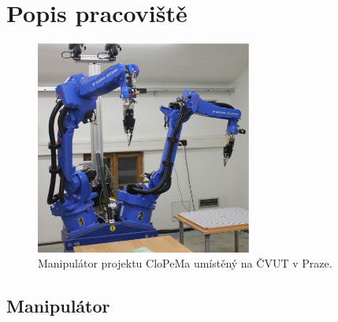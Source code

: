 \documentclass[10pt,a4paper,titlepage,oneside]{report}
\begin{document}
\section{Popis pracoviště}
\label{sec:desription}


\begin{figure}[H]
	\centering  	
  	\includegraphics[height=7cm]{pictures/robotCTU.eps}
  	\caption[]{Manipulátor projektu CloPeMa umístěný na ČVUT v Praze.}
  	\label{fig:manipulatorCVUT}
\end{figure}

\subsection{Manipulátor}
\label{subsec:manipulator}
\end{document}
